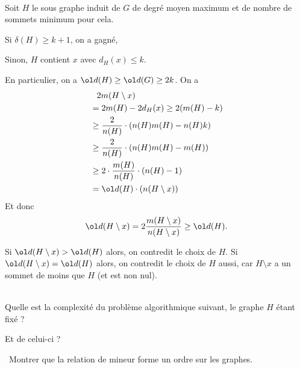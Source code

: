 \begin{td-sol}\,\\
    Soit \(H\) le sous graphe induit de \(G\) de degr\'e moyen maximum et de nombre de sommets minimum pour cela.

    Si \(\delta(H) \geq k + 1\), on a gagn\'e,

    Sinon, \(H\) contient \(x\) avec \(d_H(x) \leq k\).

    En particulier, on a \(\ol d(H) \geq \ol d(G) \geq 2k\).
    On a 
    \begin{equation*}
        \begin{aligned}
            &\hphantom{=} 2m(H \setminus x) \\
            &= 2m(H) - 2d_H(x) \geq 2(m(H) - k) \\
            &\geq \frac2{n(H)} \cdot \left(n(H) m(H) - n(H) k\right) \\
            &\geq \frac2{n(H)} \cdot \left(n(H) m(H) - m(H)\right) \\
            &\geq 2 \cdot \frac{m(H)}{n(H)} \cdot (n(H) - 1) \\
            &= \ol d(H) \cdot (n(H \setminus x)) \\
        \end{aligned}
    \end{equation*}
    Et donc
    \begin{equation*}
        \ol d(H \setminus x) = 2 \frac{m(H \setminus x)}{n(H \setminus x)} \geq \ol d(H).
    \end{equation*}

    Si \(\ol d(H \setminus x) > \ol d(H)\) alors, on contredit le choix de \(H\).
    Si \(\ol d(H \setminus x) = \ol d(H)\) alors, on contredit le choix de \(H\) aussi, car \(H \setminus x\) a un sommet de moins que \(H\) (et est non nul).
\end{td-sol}

\begin{td-exo}\,\\
    Quelle est la complexit\'e du probl\`eme algorithmique suivant, le graphe \(H\) \'etant fix\'e ?

    Et de celui-ci ?

\end{td-exo}


\begin{td-exo}\, %
    Montrer que la relation de mineur forme un ordre sur les graphes.
\end{td-exo}

